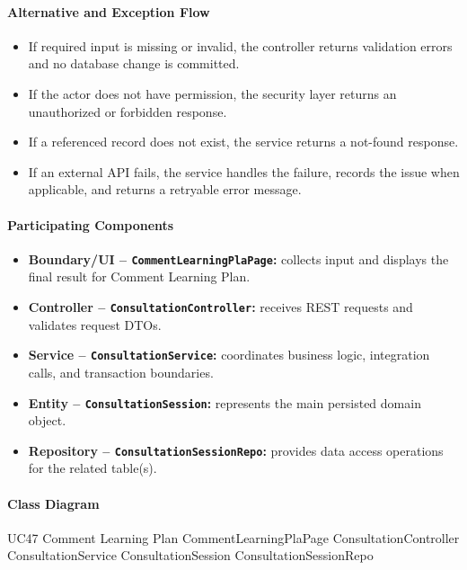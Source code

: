 \paragraph{Alternative and Exception Flow}

\begin{itemize}
    \item If required input is missing or invalid, the controller returns validation errors and no database change is committed.
    \item If the actor does not have permission, the security layer returns an unauthorized or forbidden response.
    \item If a referenced record does not exist, the service returns a not-found response.
    \item If an external API fails, the service handles the failure, records the issue when applicable, and returns a retryable error message.
\end{itemize}

\paragraph{Participating Components}

\begin{itemize}
    \item \textbf{Boundary/UI -- \texttt{CommentLearningPlaPage}:} collects input and displays the final result for Comment Learning Plan.
    \item \textbf{Controller -- \texttt{ConsultationController}:} receives REST requests and validates request DTOs.
    \item \textbf{Service -- \texttt{ConsultationService}:} coordinates business logic, integration calls, and transaction boundaries.
    \item \textbf{Entity -- \texttt{ConsultationSession}:} represents the main persisted domain object.
    \item \textbf{Repository -- \texttt{ConsultationSessionRepo}:} provides data access operations for the related table(s).
\end{itemize}

\paragraph{Class Diagram}

\ClassDiagram
{UC47 Comment Learning Plan}
{CommentLearningPlaPage}
{ConsultationController}
{ConsultationService}
{ConsultationSession}
{ConsultationSessionRepo}

